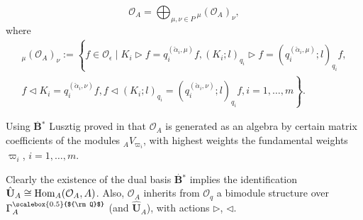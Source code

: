 \documentclass[11pt]{amsart}
\newcommand{\e}{\epsilon}
\newcommand{\Oo}{\mathcal{O}}
\newcommand{\Q}{{\scalebox{0.5}{${\rm Q}$}}}
\begin{document}
\begin{equation}\label{OAweightdecomp} \Oo_A = \bigoplus_{\mu,\nu\in P} {}_\mu\!\left(\Oo_A\right)_{\nu},
\end{equation}
where 
\begin{multline}\label{weightspaceOA}
{}_\mu\!\left(\Oo_A\right)_{\nu} :=\left\lbrace f\in \Oo_\e\mid  K_i\rhd f =q_i^{(\check{\alpha}_i,\mu)}f,  ( K_i; l)_{q_i}\rhd f = ( q_i^{(\check{\alpha}_i,\mu)}; l)_{q_i}f,\right. \\ \left. f \lhd K_i =q_i^{(\check{\alpha}_i,\nu)}f,  f \lhd ( K_i; l)_{q_i} = ( q_i^{(\check{\alpha}_i,\nu)}; l)_{q_i}f, i=1,\ldots,m\right\rbrace.
\end{multline}

Using $\stackrel{.}{\mathbf{B}}{\!\!^*}$ Lusztig proved in \cite[Prop.\,3.3]{Lusztig3} that $\Oo_A$ is generated as an algebra by certain matrix coefficients of the modules ${}_AV_{\varpi_i}$, with highest weights the fundamental weights $\varpi_i$, $i=1,\ldots,m$.

\indent Clearly the existence of the dual basis $\stackrel{.}{\mathbf{B}}{\!\!^*}$ implies the identification $\hat{{\mathbf{U}}}_A \cong {\rm Hom}_A(\Oo_A,A)$. Also, $\Oo_A$ inherits from $\Oo_q$ a bimodule structure over $\Gamma_A^\Q$ (and $\hat{{\mathbf{U}}}_A$), with actions $\rhd$, $\lhd$.
\smallskip
\end{document}
